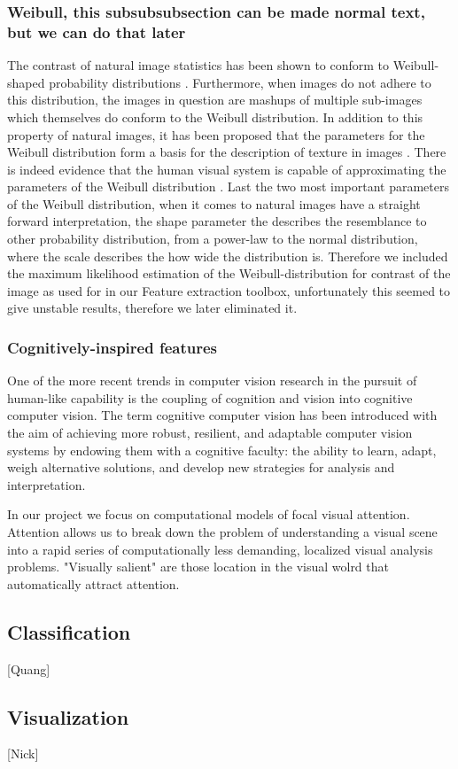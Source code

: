 \subsubsection{Weibull, this subsubsubsection can be made normal text, but we can do that later}
The contrast of natural image statistics has been shown to conform to Weibull-shaped probability distributions \cite{Weibull_physical}. Furthermore, when images do not adhere to this distribution, the images in question are mashups of multiple sub-images which themselves do conform to the Weibull distribution. In addition to this property of natural images, it has been proposed that the parameters for the Weibull distribution form a basis for the description of texture in images \cite{Weibull_6}. There is indeed evidence that the human visual system is capable of approximating the parameters of the Weibull distribution \cite{Weibull_brain}. Last the two most important parameters of the Weibull distribution, when it comes to natural images have a straight forward interpretation, the shape parameter the describes the resemblance to other probability distribution, from a power-law to the normal distribution, where the scale describes the how wide the distribution is. Therefore we included the maximum likelihood estimation of the Weibull-distribution for contrast of the image as used for \cite{Weibull_6} in our Feature extraction toolbox, unfortunately this seemed to give unstable results, therefore we later eliminated it. 

\subsubsection{Cognitively-inspired features}
One of the more recent trends in computer vision research in the pursuit of human-like capability is the coupling of cognition and vision into cognitive computer vision. 
The term cognitive computer vision has been introduced with the aim of achieving more robust, resilient, and adaptable computer vision systems by endowing them with a cognitive faculty: the ability to learn, adapt, weigh alternative solutions, and develop new strategies for analysis and interpretation.

In our project we focus on computational models of focal visual attention. Attention allows us to break down the problem of understanding a visual scene into a rapid series of computationally less demanding, localized visual analysis problems. 
"Visually salient" are those location in the visual wolrd that automatically attract attention.

\subsection{Classification}
[Quang]
\subsection{Visualization}
[Nick]
